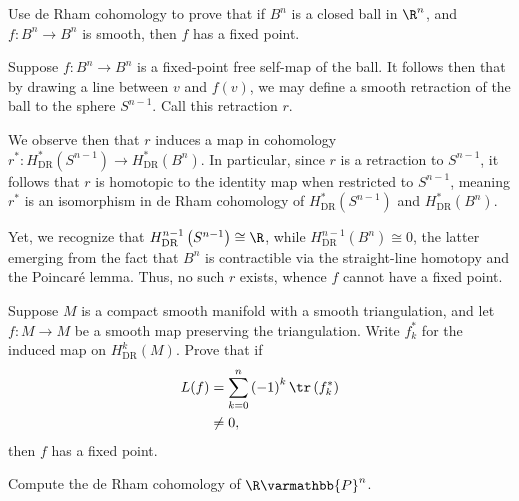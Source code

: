 \documentclass[10pt]{mypackage}
\renewcommand*{\mathbb}[1]{\varmathbb{#1}}
\begin{document}
\RaggedRight
\begin{problem}[Problem 1]
  Use de Rham cohomology to prove that if $B^{n}$ is a closed ball in $\R^{n}$, and $f\colon B^n\rightarrow B^n$ is smooth, then $f$ has a fixed point.
\end{problem}
\begin{solution}
  Suppose $f\colon B^n\rightarrow B^n$ is a fixed-point free self-map of the ball. It follows then that by drawing a line between $v$ and $f(v)$, we may define a smooth retraction of the ball to the sphere $S^{n-1}$. Call this retraction $r$.\newline

  We observe then that $r$ induces a map in cohomology $r^{\ast}\colon H^{\ast}_{\operatorname{DR}}\left( S^{n-1} \right)\rightarrow H^{\ast}_{\operatorname{DR}}\left( B^{n} \right)$. In particular, since $r$ is a retraction to $S^{n-1}$, it follows that $r$ is homotopic to the identity map when restricted to $S^{n-1}$, meaning $r^{\ast}$ is an isomorphism in de Rham cohomology of $H^{\ast}_{\operatorname{DR}}\left( S^{n-1} \right)$ and $H^{\ast}_{\operatorname{DR}}\left( B^n \right)$.\newline

  Yet, we recognize that $H^{n-1}_{\operatorname{DR}}\left( S^{n-1} \right)\cong \R$, while $H^{n-1}_{\operatorname{DR}}\left( B^{n} \right)\cong 0$, the latter emerging from the fact that $B^n$ is contractible via the straight-line homotopy and the Poincaré lemma. Thus, no such $r$ exists, whence $f$ cannot have a fixed point.
\end{solution}
\begin{problem}[Problem 2]
  Suppose $M$ is a compact smooth manifold with a smooth triangulation, and let $f\colon M\rightarrow M$ be a smooth map preserving the triangulation. Write $f_k^{\ast}$ for the induced map on $H^k_{\operatorname{DR}}\left( M \right)$. Prove that if
  \begin{align*}
    L(f) &= \sum_{k=0}^{n} \left( -1 \right)^{k}\tr\left( f_k^{\ast} \right)\\
         &\neq 0,
  \end{align*}
  then $f$ has a fixed point.
\end{problem}
\begin{problem}[Problem 3]
  Compute the de Rham cohomology of $\R\mathbb{P}^{n}$.
\end{problem}
\end{document}
